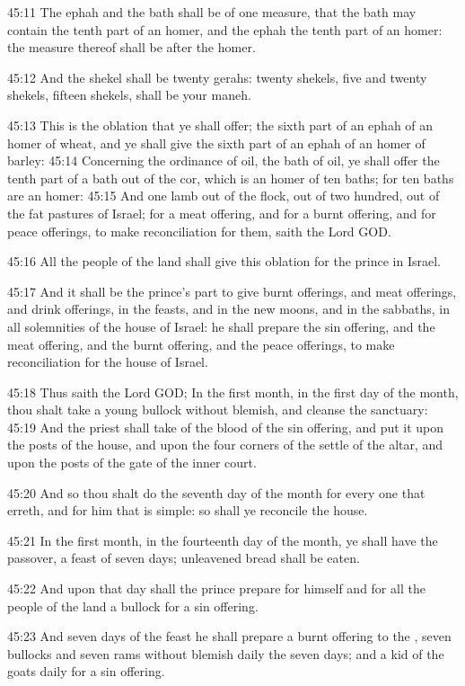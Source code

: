 45:11 The ephah and the bath shall be of one measure, that the bath
may contain the tenth part of an homer, and the ephah the tenth part
of an homer: the measure thereof shall be after the homer.

45:12 And the shekel shall be twenty gerahs: twenty shekels, five and
twenty shekels, fifteen shekels, shall be your maneh.

45:13 This is the oblation that ye shall offer; the sixth part of an
ephah of an homer of wheat, and ye shall give the sixth part of an
ephah of an homer of barley: 45:14 Concerning the ordinance of oil,
the bath of oil, ye shall offer the tenth part of a bath out of the
cor, which is an homer of ten baths; for ten baths are an homer: 45:15
And one lamb out of the flock, out of two hundred, out of the fat
pastures of Israel; for a meat offering, and for a burnt offering, and
for peace offerings, to make reconciliation for them, saith the Lord
GOD.

45:16 All the people of the land shall give this oblation for the
prince in Israel.

45:17 And it shall be the prince's part to give burnt offerings, and
meat offerings, and drink offerings, in the feasts, and in the new
moons, and in the sabbaths, in all solemnities of the house of Israel:
he shall prepare the sin offering, and the meat offering, and the
burnt offering, and the peace offerings, to make reconciliation for
the house of Israel.

45:18 Thus saith the Lord GOD; In the first month, in the first day of
the month, thou shalt take a young bullock without blemish, and
cleanse the sanctuary: 45:19 And the priest shall take of the blood of
the sin offering, and put it upon the posts of the house, and upon the
four corners of the settle of the altar, and upon the posts of the
gate of the inner court.

45:20 And so thou shalt do the seventh day of the month for every one
that erreth, and for him that is simple: so shall ye reconcile the
house.

45:21 In the first month, in the fourteenth day of the month, ye shall
have the passover, a feast of seven days; unleavened bread shall be
eaten.

45:22 And upon that day shall the prince prepare for himself and for
all the people of the land a bullock for a sin offering.

45:23 And seven days of the feast he shall prepare a burnt offering to
the \LORD, seven bullocks and seven rams without blemish daily the
seven days; and a kid of the goats daily for a sin offering.

